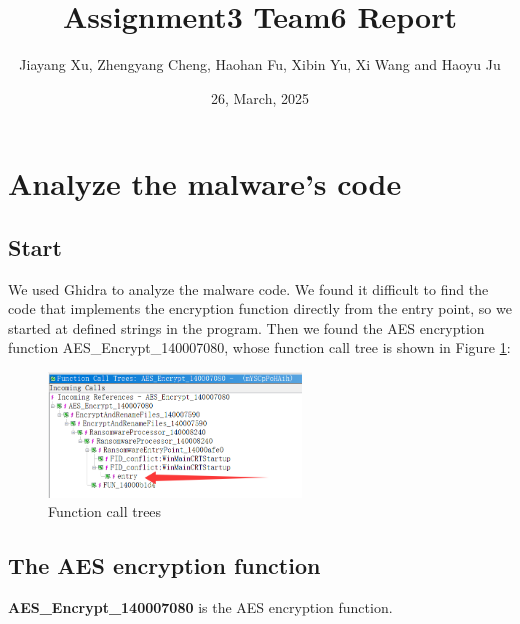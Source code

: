 \documentclass[11pt]{article}
\begin{document}
\title{Assignment3 Team6 Report}
\author{Jiayang Xu, Zhengyang Cheng, Haohan Fu, Xibin Yu, Xi Wang and Haoyu Ju}
\date{26, March, 2025}
\maketitle

\section{Analyze the malware's code}
\subsection{Start}
We used Ghidra to analyze the malware code. We found it difficult to find the code that implements the encryption function directly from the entry point, so we started at defined strings in the program. Then we found the AES encryption function AES\_Encrypt\_140007080, whose function call tree is shown in Figure \ref{Call Trees}:

\begin{figure}[htbp]
    \centering
    \includegraphics[width=0.6\textwidth]{img/Call Trees.png}
    \caption{Function call trees}
    \label{Call Trees}
\end{figure}

\subsection{The AES encryption function}
\textbf{AES\_Encrypt\_140007080} is the AES encryption function.
\end{document}
